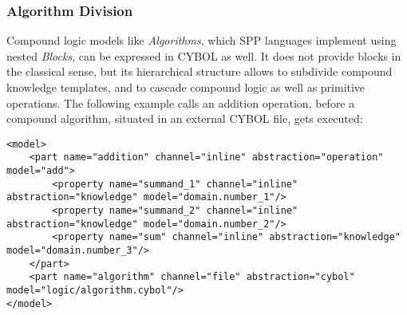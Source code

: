 %
%
%
%
%
%
%

\subsubsection{Algorithm Division}
\label{algorithm_division_heading}

Compound logic models like \emph{Algorithms}, which SPP languages implement
using nested \emph{Blocks}, can be expressed in CYBOL as well. It does not
provide blocks in the classical sense, but its hierarchical structure allows to
subdivide compound knowledge templates, and to cascade compound logic as well
as primitive operations. The following example calls an addition operation,
before a compound algorithm, situated in an external CYBOL file, gets executed:

\begin{scriptsize}
    \begin{verbatim}
<model>
    <part name="addition" channel="inline" abstraction="operation" model="add">
        <property name="summand_1" channel="inline" abstraction="knowledge" model="domain.number_1"/>
        <property name="summand_2" channel="inline" abstraction="knowledge" model="domain.number_2"/>
        <property name="sum" channel="inline" abstraction="knowledge" model="domain.number_3"/>
    </part>
    <part name="algorithm" channel="file" abstraction="cybol" model="logic/algorithm.cybol"/>
</model>
    \end{verbatim}
\end{scriptsize}
